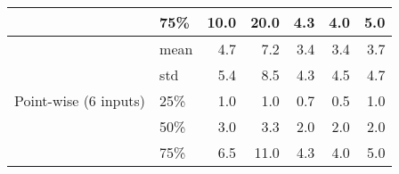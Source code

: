 \begin{table}[t]
\begin{tabular}{@{}llrrrrr}
	                                                  & 75\% &   10.0 &        20.0 &  4.3 &    4.0 &    5.0 \\ \midrule
	\multirow{5}{*}{Point-wise (6 inputs)} & mean &    4.7 &         7.2 &  3.4 &    3.4 &    3.7 \\
	                                                  & std  &    5.4 &         8.5 &  4.3 &    4.5 &    4.7 \\
	                                                  & 25\% &    1.0 &         1.0 &  0.7 &    0.5 &    1.0 \\
	                                                  & 50\% &    3.0 &         3.3 &  2.0 &    2.0 &    2.0 \\
	                                                  & 75\% &    6.5 &        11.0 &  4.3 &    4.0 &    5.0 \\
	                                                   \bottomrule
\end{tabular}
\end{table}


